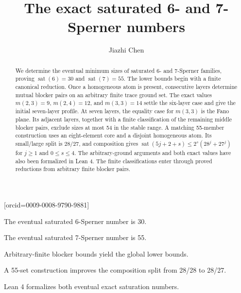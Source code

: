 \documentclass[a4paper,fleqn,longmktitle]{cas-sc}
\theoremstyle{definition}
\theoremstyle{remark}
\newcommand{\sat}{\operatorname{sat}}
\begin{document}
\let\WriteBookmarks\relax
\def\floatpagepagefraction{1}
\def\textpagefraction{.001}


\title[mode=title]{The exact saturated 6- and 7-Sperner numbers}

\author[1]{Jiazhi Chen}[orcid=0009-0008-9790-9881]
\cormark[1]



\begin{abstract}
We determine the eventual minimum sizes of saturated 6- and 7-Sperner
families, proving $\sat(6)=30$ and $\sat(7)=55$.  The lower bounds begin with
a finite canonical reduction.  Once a homogeneous atom is present,
consecutive layers determine mutual blocker pairs on an arbitrary finite
trace ground set.  The exact values $m(2,3)=9$, $m(2,4)=12$, and
$m(3,3)=14$ settle the six-layer case and give the initial seven-layer
profile.  At seven layers, the equality case for $m(3,3)$ is the Fano plane.
Its adjacent layers, together with a finite classification of the remaining
middle blocker pairs, exclude sizes at most 54 in the stable range.  A matching
55-member construction uses an eight-element core and a disjoint homogeneous
atom.  Its small/large split is $28/27$, and composition gives
$\sat(5j+2+s)\leq 2^s(28^j+27^j)$ for $j\geq1$ and
$0\leq s\leq4$.
The arbitrary-ground arguments and both exact values have also been
formalized in Lean 4.  The finite classifications enter through proved
reductions from arbitrary finite blocker pairs.
\end{abstract}

\begin{highlights}
\item The eventual saturated 6-Sperner number is 30.
\item The eventual saturated 7-Sperner number is 55.
\item Arbitrary-finite blocker bounds yield the global lower bounds.
\item A 55-set construction improves the composition split from 28/28 to 28/27.
\item Lean 4 formalizes both eventual exact saturation numbers.
\end{highlights}
\end{document}
